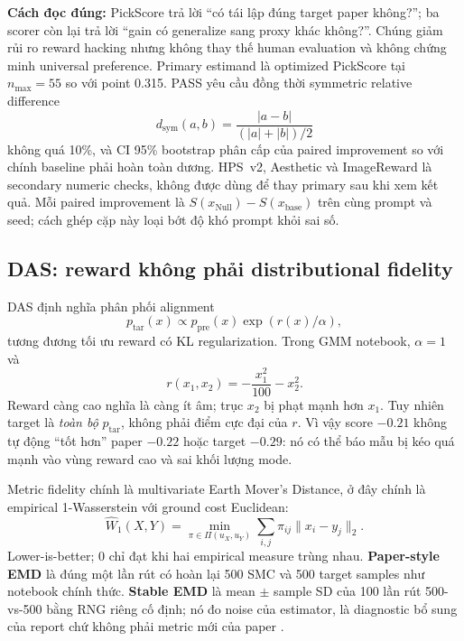 \documentclass[11pt,a4paper]{article}
\begin{document}
\textbf{Cách đọc đúng:} PickScore trả lời ``có tái lập đúng target paper không?''; ba scorer còn lại trả lời ``gain có generalize sang proxy khác không?''. Chúng giảm rủi ro reward hacking nhưng không thay thế human evaluation và không chứng minh universal preference. Primary estimand là optimized PickScore tại $n_{\max}=55$ so với point 0.315. PASS yêu cầu đồng thời symmetric relative difference
\begin{equation}
d_{\mathrm{sym}}(a,b)=\frac{|a-b|}{(|a|+|b|)/2}
\end{equation}
không quá 10\%, và CI 95\% bootstrap phân cấp của paired improvement so với chính baseline phải hoàn toàn dương. HPS~v2, Aesthetic và ImageReward là secondary numeric checks, không được dùng để thay primary sau khi xem kết quả. Mỗi paired improvement là $S(x_{\mathrm{Null}})-S(x_{\mathrm{base}})$ trên cùng prompt và seed; cách ghép cặp này loại bớt độ khó prompt khỏi sai số.

\subsection{DAS: reward không phải distributional fidelity}

DAS định nghĩa phân phối alignment
\begin{equation}
p_{\mathrm{tar}}(x) \propto p_{\mathrm{pre}}(x)\exp(r(x)/\alpha),
\end{equation}
tương đương tối ưu reward có KL regularization. Trong GMM notebook, $\alpha=1$ và
\begin{equation}
  r(x_1,x_2)=-\frac{x_1^2}{100}-x_2^2.
\end{equation}
Reward càng cao nghĩa là càng ít âm; trục $x_2$ bị phạt mạnh hơn $x_1$. Tuy nhiên target là \emph{toàn bộ} $p_{\mathrm{tar}}$, không phải điểm cực đại của $r$. Vì vậy score $-0.21$ không tự động ``tốt hơn'' paper $-0.22$ hoặc target $-0.29$: nó có thể báo mẫu bị kéo quá mạnh vào vùng reward cao và sai khối lượng mode.

Metric fidelity chính là multivariate Earth Mover's Distance, ở đây chính là empirical 1-Wasserstein với ground cost Euclidean:
\begin{equation}
  \widehat W_1(X,Y)=\min_{\pi\in\Pi(u_X,u_Y)}
  \sum_{i,j}\pi_{ij}\lVert x_i-y_j\rVert_2.
\end{equation}
Lower-is-better; 0 chỉ đạt khi hai empirical measure trùng nhau. \textbf{Paper-style EMD} là đúng một lần rút có hoàn lại 500 SMC và 500 target samples như notebook chính thức. \textbf{Stable EMD} là mean $\pm$ sample SD của 100 lần rút 500-vs-500 bằng RNG riêng cố định; nó đo noise của estimator, là diagnostic bổ sung của report chứ không phải metric mới của paper \citep{Kim2025DAS,DASCode}.
\end{document}
